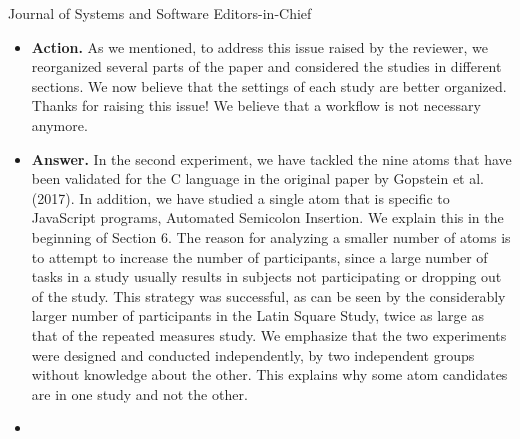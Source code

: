 \documentclass{letter}
\begin{document}
\begin{letter}{Journal of Systems and Software Editors-in-Chief}
\begin{itemize}
{\bf Action.} We have cut about 85 words from the abstract, specifically from the part about the contributions. We avoided cutting more because the paper presents the results of four different studies and the abstract to a certain extent reflects that. 

\item {}

{\bf Action.} As we mentioned, to address this issue raised by the reviewer, we reorganized several parts of the paper and considered the studies in different sections. We now believe that the settings of each study are better organized. Thanks for raising this issue! We believe that a workflow is not necessary anymore. 

\item {}

{\bf Answer.} In the second experiment, we have tackled the nine atoms that have been validated for the C language in the original paper by Gopstein et al. (2017). In addition, we have studied a single atom that is specific to JavaScript programs, Automated Semicolon Insertion. We explain this in the beginning of Section 6. The reason for analyzing a smaller number of atoms is to attempt to increase the number of participants, since a large number of tasks in a study usually results in subjects not participating or dropping out of the study. This strategy was successful, as can be seen by the considerably larger number of participants in the Latin Square Study, twice as large as that of the repeated measures study. We emphasize that the two experiments were designed and conducted independently, by two independent groups without knowledge about the other. This explains why some atom candidates are in one study and not the other.

\item {}


\end{itemize}
\end{letter}
\end{document}
